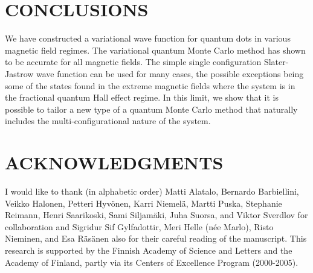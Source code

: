 \documentclass{article}
\begin{document}
\section{CONCLUSIONS}

We have constructed a variational wave function for quantum dots in
various magnetic field regimes.  The variational quantum Monte Carlo
method has shown to be accurate for all magnetic fields. The simple
single configuration Slater-Jastrow wave function can be used for many
cases, the possible exceptions being some of the states found in the
extreme magnetic fields where the system is in the fractional quantum
Hall effect regime. In this limit, we show that it is possible to
tailor a new type of a quantum Monte Carlo method that naturally
includes the multi-configurational nature of the system.

\section*{ACKNOWLEDGMENTS}

I would like to thank (in alphabetic order)
%
 Matti Alatalo,
 Bernardo Barbiellini,
 Veikko Halonen,
 Petteri Hyv\"onen,
 Karri Niemel\"a,
 Martti Puska,
 Stephanie Reimann,
 Henri Saarikoski,
 Sami Siljam\"aki,
 Juha Suorsa, and
 Viktor Sverdlov
%
for collaboration and 
%
 Sigridur Sif Gylfadottir,
 Meri Helle (n\'ee Marlo),
 Risto Nieminen, and
 Esa R\"as\"anen
%
also for their careful reading of the manuscript. This research is
supported by the Finnish Academy of Science and Letters and the
Academy of Finland, partly via its Centers of Excellence Program
(2000-2005).
\end{document}
